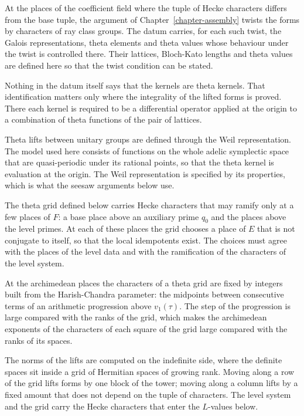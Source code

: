 At the places of the coefficient field where the tuple of Hecke characters
differs from the base tuple, the argument of Chapter~\ref{chapter-assembly}
twists the forms by characters of ray class groups. The datum carries, for each
such twist, the Galois representations, theta elements and theta values whose
behaviour under the twist is controlled there. Their lattices, Bloch-Kato
lengths and theta values are defined here so that the twist condition can be
stated.

Nothing in the datum itself says that the kernels are theta kernels. That
identification matters only where the integrality of the lifted forms is
proved. There each kernel is required to be a differential operator applied at
the origin to a combination of theta functions of the pair of lattices.

Theta lifts between unitary groups are defined through the Weil
representation. The model used here consists of functions on the whole adelic
symplectic space that are quasi-periodic under its rational points, so that
the theta kernel is evaluation at the origin. The Weil representation is
specified by its properties, which is what the seesaw arguments below use.

The theta grid defined below carries Hecke characters that may ramify only at
a few places of $F$: a base place above an auxiliary prime $q_0$ and the places
above the level primes. At each of these places the grid chooses a place of $E$
that is not conjugate to itself, so that the local idempotents exist. The
choices must agree with the places of the level data and with the ramification
of the characters of the level system.

At the archimedean places the characters of a theta grid are fixed by integers
built from the Harish-Chandra parameter: the midpoints between consecutive
terms of an arithmetic progression above $v_1(\tau)$. The step of the
progression is large compared with the ranks of the grid, which makes the
archimedean exponents of the characters of each square of the grid large
compared with the ranks of its spaces.

The norms of the lifts are computed on the indefinite side, where the definite
spaces sit inside a grid of Hermitian spaces of growing rank. Moving along a
row of the grid lifts forms by one block of the tower; moving along a column
lifts by a fixed amount that does not depend on the tuple of characters. The
level system and the grid carry the Hecke characters that enter the $L$-values
below.

